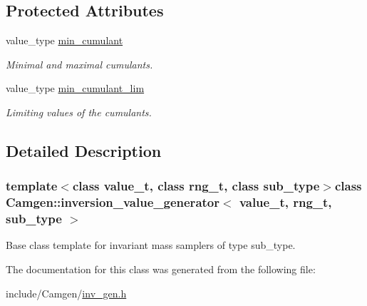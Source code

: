 \subsection*{Protected Attributes}
\begin{DoxyCompactItemize}
\item 
\hypertarget{a00321_a13e806e148ad644a782b268bb941075a}{}value\+\_\+type \hyperlink{a00321_a13e806e148ad644a782b268bb941075a}{min\+\_\+cumulant}\label{a00321_a13e806e148ad644a782b268bb941075a}

\begin{DoxyCompactList}\small\item\em Minimal and maximal cumulants. \end{DoxyCompactList}\item 
\hypertarget{a00321_a1a574dcdb2d8d98a07f64e7153098bec}{}value\+\_\+type \hyperlink{a00321_a1a574dcdb2d8d98a07f64e7153098bec}{min\+\_\+cumulant\+\_\+lim}\label{a00321_a1a574dcdb2d8d98a07f64e7153098bec}

\begin{DoxyCompactList}\small\item\em Limiting values of the cumulants. \end{DoxyCompactList}\end{DoxyCompactItemize}


\subsection{Detailed Description}
\subsubsection*{template$<$class value\+\_\+t, class rng\+\_\+t, class sub\+\_\+type$>$class Camgen\+::inversion\+\_\+value\+\_\+generator$<$ value\+\_\+t, rng\+\_\+t, sub\+\_\+type $>$}

Base class template for invariant mass samplers of type sub\+\_\+type. 

The documentation for this class was generated from the following file\+:\begin{DoxyCompactItemize}
\item 
include/\+Camgen/\hyperlink{a00672}{inv\+\_\+gen.\+h}\end{DoxyCompactItemize}
